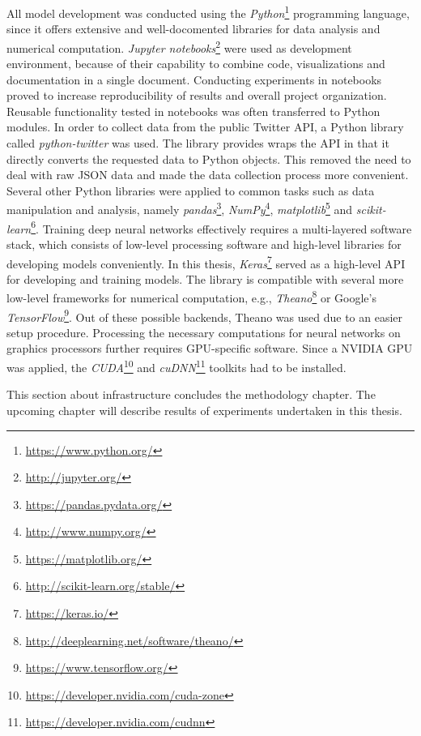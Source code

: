 All model development was conducted using the \textit{Python}\footnote{\url{https://www.python.org/}} programming language,
since it offers extensive and well-docomented libraries for data analysis and numerical computation.
\textit{Jupyter notebooks}\footnote{\url{http://jupyter.org/}} were used as development environment, because
of their capability to combine code, visualizations and documentation in a single
document.
Conducting experiments in notebooks proved to increase reproducibility of results
and overall project organization.
Reusable functionality tested in notebooks was often transferred to Python
modules.
In order to collect data from the public Twitter API, a Python library called
\textit{python-twitter} was used.
The library provides wraps the API in that it directly converts the requested
data to Python objects.
This removed the need to deal with raw JSON data and made the data collection
process more convenient.
Several other Python libraries were applied to common tasks such as data
manipulation and analysis, namely \textit{pandas}\footnote{\url{https://pandas.pydata.org/}},
\textit{NumPy}\footnote{\url{http://www.numpy.org/}},
\textit{matplotlib}\footnote{\url{https://matplotlib.org/}} and
\textit{scikit-learn}\footnote{\url{http://scikit-learn.org/stable/}}.
Training deep neural networks effectively requires a multi-layered software
stack, which consists of low-level processing software and high-level libraries
for developing models conveniently.
In this thesis, \textit{Keras}\footnote{\url{https://keras.io/}} served as a
high-level API for developing and training models.
The library is compatible with several more low-level frameworks for numerical
computation, e.g., \textit{Theano}\footnote{\url{http://deeplearning.net/software/theano/}} 
or Google's \textit{TensorFlow}\footnote{\url{https://www.tensorflow.org/}}.
Out of these possible backends, Theano was used due to an easier setup procedure.
Processing the necessary computations for neural networks on graphics processors
further requires GPU-specific software.
Since a NVIDIA GPU was applied, the \textit{CUDA}\footnote{\url{https://developer.nvidia.com/cuda-zone}}
and \textit{cuDNN}\footnote{\url{https://developer.nvidia.com/cudnn}} toolkits
had to be installed.

This section about infrastructure concludes the methodology chapter.
The upcoming chapter will describe results of experiments undertaken in this
thesis.
